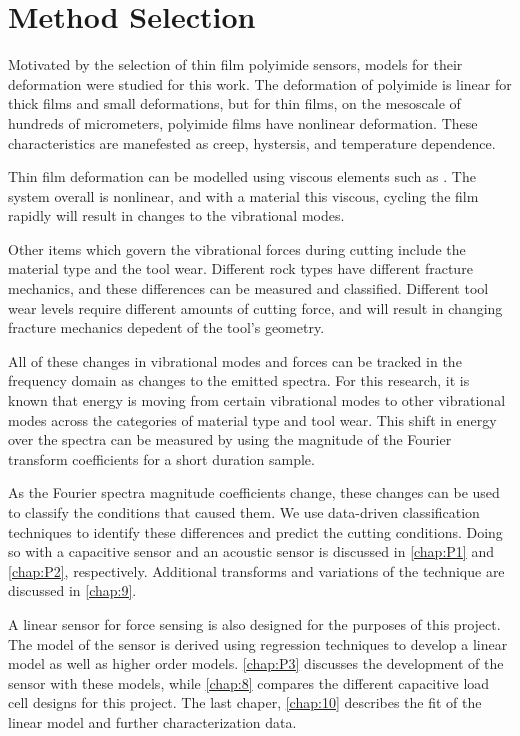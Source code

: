 \chapter{Method Selection}

Motivated by the selection of thin film polyimide sensors, 
models for their deformation were studied for this work.
The deformation of polyimide is linear for thick films
and small deformations, but for thin films, 
on the mesoscale of hundreds of micrometers,
polyimide films have nonlinear deformation.
These characteristics are manefested as creep, hystersis, 
and temperature dependence.

Thin film deformation can be modelled using viscous elements such as
.
The system overall is nonlinear, and with a material this viscous,
cycling the film rapidly will result in changes to the vibrational modes.

Other items which govern the vibrational forces during cutting include
the material type and the tool wear. 
Different rock types have different fracture mechanics, 
and these differences can be measured and classified.
Different tool wear levels require different amounts of cutting force,
and will result in changing fracture mechanics depedent of the tool's geometry.

All of these changes in vibrational modes and forces can be tracked in the
frequency domain as changes to the emitted spectra. For this research,
it is known that energy is moving from certain vibrational
modes to other vibrational modes across the categories of material type
and tool wear. This shift in energy over the spectra can be measured
by using the magnitude of the Fourier transform coefficients for a 
short duration sample.

As the Fourier spectra magnitude coefficients change, these changes 
can be used to classify the conditions that caused them.
We use data-driven classification techniques to identify these differences and 
predict the cutting conditions.
Doing so with a capacitive sensor and an acoustic sensor
is discussed in \ref{chap:P1} and \ref{chap:P2}, respectively.
Additional transforms and variations of the technique are discussed in \ref{chap:9}.

A linear sensor for force sensing is also designed for the purposes of this project.
The model of the sensor is derived using regression techniques to develop a linear model 
as well as higher order models.
\ref{chap:P3} discusses the development of the sensor with these models, 
while \ref{chap:8} compares the different capacitive load cell designs for this project.
The last chaper, \ref{chap:10} describes the fit of the linear model and 
further characterization data.


